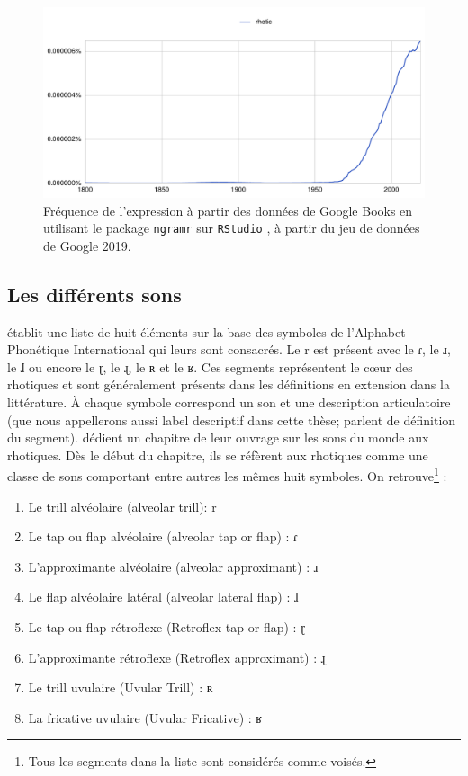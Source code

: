 \begin{figure}
	\centering
	\includegraphics[width=1\linewidth]{images/google_ngram_rhotic}
	\caption[Google n-grams de ]{Fréquence de l'expression  à partir des données de Google Books en utilisant le package \texttt{ngramr} sur \texttt{RStudio} \parencite{rcoreteamLanguageEnvironmentStatistical2020}, à partir du jeu de données de Google 2019.}
	\label{fig:googlengramrhotic}
\end{figure}

\subsection{Les différents sons }

\textcite{wieseRepresentationRhoticsRepresentation2011} établit une liste de huit éléments sur la base des symboles de l'Alphabet Phonétique International qui leurs sont consacrés. Le  r est présent avec le ɾ, le ɹ, le ɺ ou encore le ɽ, le ɻ, le ʀ et le ʁ. Ces segments représentent le cœur des rhotiques et sont généralement présents dans les définitions en extension dans la littérature. À chaque symbole correspond un son et une description articulatoire (que nous appellerons aussi label descriptif dans cette thèse; \textcite{ladefogedSoundsWorldLanguages1996} parlent de définition du segment). \textcite{ladefogedSoundsWorldLanguages1996} dédient un chapitre de leur ouvrage sur les sons du monde aux rhotiques. Dès le début du chapitre, ils se réfèrent aux rhotiques comme une classe de sons comportant entre autres les mêmes huit symboles. On retrouve\footnote{Tous les segments dans la liste sont considérés comme voisés.} :

\begin{enumerate}
	\item Le trill alvéolaire (alveolar trill): r
	\item Le tap ou flap alvéolaire (alveolar tap or flap) : ɾ
	\item L'approximante alvéolaire (alveolar approximant) : ɹ
	\item Le flap alvéolaire latéral (alveolar lateral flap) : ɺ
	\item Le tap ou flap  rétroflexe (Retroflex tap or flap) : ɽ
	\item L'approximante rétroflexe (Retroflex approximant) : ɻ
	\item Le trill uvulaire (Uvular Trill) : ʀ
	\item La fricative uvulaire (Uvular Fricative) : ʁ
\end{enumerate}

